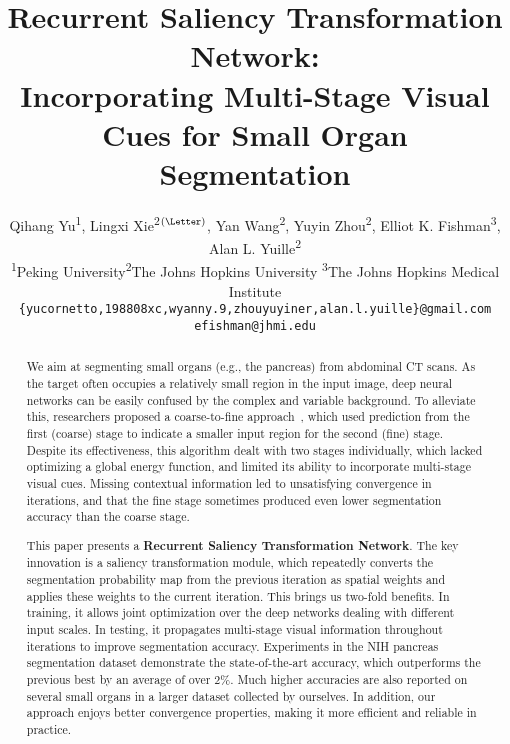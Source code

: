 \documentclass[10pt,twocolumn,letterpaper]{article}
\begin{document}
\title{Recurrent Saliency Transformation Network: \\ Incorporating Multi-Stage Visual Cues for Small Organ Segmentation}

\author{Qihang Yu\textsuperscript{1}, Lingxi Xie\textsuperscript{2}$^{(\textrm{\Letter})}$, Yan Wang\textsuperscript{2},
Yuyin Zhou\textsuperscript{2}, Elliot K. Fishman\textsuperscript{3}, Alan L. Yuille\textsuperscript{2}\\
\textsuperscript{1}Peking University\quad\textsuperscript{2}The Johns Hopkins University\quad
\textsuperscript{3}The Johns Hopkins Medical Institute\\
{\tt\small \{yucornetto,198808xc,wyanny.9,zhouyuyiner,alan.l.yuille\}@gmail.com}\quad
{\tt\small efishman@jhmi.edu}\\
}

\maketitle

\begin{abstract}
We aim at segmenting small organs (e.g., the pancreas) from abdominal CT scans.
As the target often occupies a relatively small region in the input image,
deep neural networks can be easily confused by the complex and variable background.
To alleviate this, researchers proposed a coarse-to-fine approach~\cite{Zhou_2017_Fixed},
which used prediction from the first (coarse) stage to indicate a smaller input region for the second (fine) stage.
Despite its effectiveness, this algorithm dealt with two stages individually,
which lacked optimizing a global energy function, and limited its ability to incorporate multi-stage visual cues.
Missing contextual information led to unsatisfying convergence in iterations,
and that the fine stage sometimes produced even lower segmentation accuracy than the coarse stage.

This paper presents a {\bf Recurrent Saliency Transformation Network}.
The key innovation is a saliency transformation module,
which repeatedly converts the segmentation probability map from the previous iteration as spatial weights
and applies these weights to the current iteration.
This brings us two-fold benefits.
In training, it allows joint optimization over the deep networks dealing with different input scales.
In testing, it propagates multi-stage visual information throughout iterations to improve segmentation accuracy.
Experiments in the NIH pancreas segmentation dataset demonstrate the state-of-the-art accuracy,
which outperforms the previous best by an average of over $2\%$.
Much higher accuracies are also reported on several small organs in a larger dataset collected by ourselves.
In addition, our approach enjoys better convergence properties, making it more efficient and reliable in practice.
\end{abstract}
\end{document}
